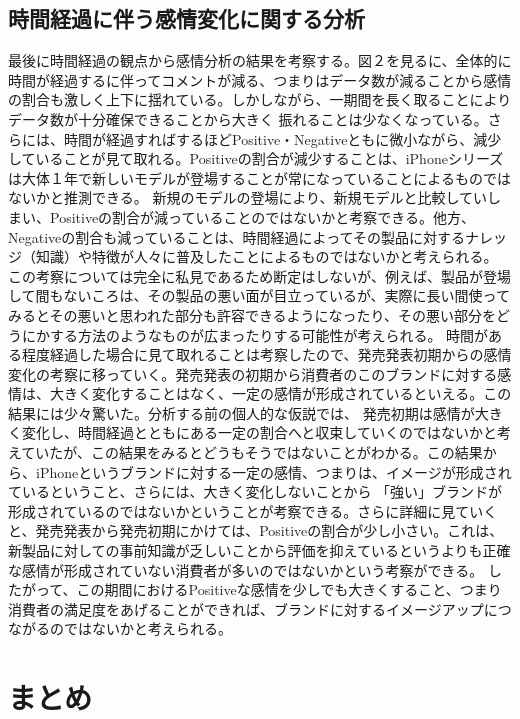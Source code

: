 \documentclass[uplatex,11pt]{jsarticle}
\begin{document}
\subsection{時間経過に伴う感情変化に関する分析}
最後に時間経過の観点から感情分析の結果を考察する。図２を見るに、全体的に時間が経過するに伴ってコメントが減る、つまりはデータ数が減ることから感情の割合も激しく上下に揺れている。しかしながら、一期間を長く取ることによりデータ数が十分確保できることから大きく
振れることは少なくなっている。さらには、時間が経過すればするほどPositive・Negativeともに微小ながら、減少していることが見て取れる。Positiveの割合が減少することは、iPhoneシリーズは大体１年で新しいモデルが登場することが常になっていることによるものではないかと推測できる。
新規のモデルの登場により、新規モデルと比較していしまい、Positiveの割合が減っていることのではないかと考察できる。他方、Negativeの割合も減っていることは、時間経過によってその製品に対するナレッジ（知識）や特徴が人々に普及したことによるものではないかと考えられる。
この考察については完全に私見であるため断定はしないが、例えば、製品が登場して間もないころは、その製品の悪い面が目立っているが、実際に長い間使ってみるとその悪いと思われた部分も許容できるようになったり、その悪い部分をどうにかする方法のようなものが広まったりする可能性が考えられる。
時間がある程度経過した場合に見て取れることは考察したので、発売発表初期からの感情変化の考察に移っていく。発売発表の初期から消費者のこのブランドに対する感情は、大きく変化することはなく、一定の感情が形成されているといえる。この結果には少々驚いた。分析する前の個人的な仮説では、
発売初期は感情が大きく変化し、時間経過とともにある一定の割合へと収束していくのではないかと考えていたが、この結果をみるとどうもそうではないことがわかる。この結果から、iPhoneというブランドに対する一定の感情、つまりは、イメージが形成されているということ、さらには、大きく変化しないことから
「強い」ブランドが形成されているのではないかということが考察できる。さらに詳細に見ていくと、発売発表から発売初期にかけては、Positiveの割合が少し小さい。これは、新製品に対しての事前知識が乏しいことから評価を抑えているというよりも正確な感情が形成されていない消費者が多いのではないかという考察ができる。
したがって、この期間におけるPositiveな感情を少しでも大きくすること、つまり消費者の満足度をあげることができれば、ブランドに対するイメージアップにつながるのではないかと考えられる。
\section{まとめ}
\end{document}
